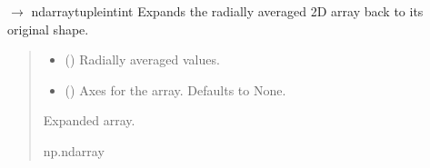 \documentclass[letterpaper,10pt,english]{sphinxmanual}
\begin{document}
\begin{fulllineitems}
\label{\detokenize{source/stattools:stattools.expand_ring_averages2d}}
\pysigstartsignatures
\pysiglinewithargsret
{}
{\sphinxparamcomma {}}
{{ $\rightarrow$ ndarray\DUrole{p}{{[}}tuple\DUrole{p}{{[}}intint\DUrole{p}{{]}}\DUrole{p}{{]}}}}
\pysigstopsignatures
\sphinxAtStartPar
Expands the radially averaged 2D array back to its original shape.
\begin{quote}\begin{description}
\begin{itemize}
\item {} 
\sphinxAtStartPar
{} () \textendash{} Radially averaged values.

\item {} 
\sphinxAtStartPar
{} (\sphinxstyleliteralemphasis{\sphinxupquote{, }}) \textendash{} Axes for the array. Defaults to None.

\end{itemize}

\sphinxAtStartPar
Expanded array.

\sphinxAtStartPar
np.ndarray

\end{description}\end{quote}

\end{fulllineitems}

\end{document}
